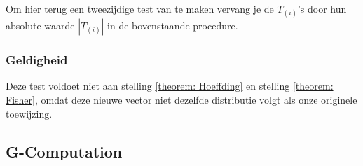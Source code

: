 \documentclass[12pt, a4paper, faculty=we]{ugent-doc}
\begin{document}
\begin{flushleft}
    Om hier terug een tweezijdige test van te maken vervang je de \(T_{(i)}\)'s door hun absolute waarde \(|T_{(i)}|\) in de bovenstaande procedure.
\end{flushleft}

\subsubsection{Geldigheid}

\begin{flushleft}
    Deze test voldoet niet aan stelling \ref{theorem: Hoeffding} en stelling \ref{theorem: Fisher}, omdat deze nieuwe vector niet dezelfde
    distributie volgt als onze originele toewijzing.
\end{flushleft}

\subsection{G-Computation}
\end{document}
